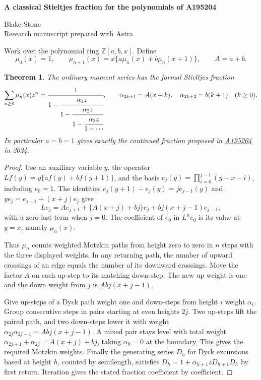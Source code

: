 \documentclass[11pt,letterpaper]{article}
\newtheorem{theorem}{Theorem}
\newcommand{\oeis}[1]{\href{https://oeis.org/A#1}{A#1}}
\begin{document}
\thispagestyle{plain}
\begin{center}
{\LARGE\bfseries A classical Stieltjes fraction for the polynomials of A195204\par}
\vspace{0.5em}
Blake Stone\\
{\small Research manuscript prepared with Astra}
\end{center}

\begin{abstract}
A falling-factorial basis turns the defining shift of OEIS A195204 into a tridiagonal operator. Pairing the steps of a Dyck path proves Peter Bala's continued-fraction conjecture directly. The resulting fraction belongs to the classical cycle--excedance Eulerian family. The same calculation gives diagonal forms over the integer polynomial ring for both the Hankel matrix and its first shift.
\end{abstract}

Work over the polynomial ring \(\mathbb Z[a,b,x]\). Define
\[
 \mu_0(x)=1,\qquad \mu_{n+1}(x)=x\{a\mu_n(x)+b\mu_n(x+1)\},\qquad A=a+b.
\]
\begin{theorem}
The ordinary moment series has the formal Stieltjes fraction
\[
  \sum_{n\ge0}\mu_n(x)z^n
  =\cfrac{1}{1-\cfrac{\alpha_1z}{1-\cfrac{\alpha_2z}
       {1-\cfrac{\alpha_3z}{1-\cdots}}}},\qquad
  \alpha_{2k+1}=A(x+k),\quad \alpha_{2k+2}=b(k+1)\quad(k\ge0).
\]
In particular \(a=b=1\) gives exactly the continued fraction proposed in \oeis{195204} in 2024.
\end{theorem}
\begin{proof}
Use an auxiliary variable \(y\), the operator \(L f(y)=y\{af(y)+bf(y+1)\}\), and the basis \(e_j(y)=\prod_{i=0}^{j-1}(y-x-i)\), including \(e_0=1\). The identities \(e_j(y+1)-e_j(y)=je_{j-1}(y)\) and \(ye_j=e_{j+1}+(x+j)e_j\) give
\[
 L e_j=A e_{j+1}+\{A(x+j)+bj\}e_j+bj(x+j-1)e_{j-1},
\]
with a zero last term when \(j=0\). The coefficient of \(e_0\) in \(L^n e_0\) is its value at \(y=x\), namely \(\mu_n(x)\).

Thus \(\mu_n\) counts weighted Motzkin paths from height zero to zero in \(n\) steps with the three displayed weights. In any returning path, the number of upward crossings of an edge equals the number of its downward crossings. Move the factor \(A\) on each up-step to its matching down-step. The new up weight is one and the down weight from \(j\) is \(Abj(x+j-1)\).

Give up-steps of a Dyck path weight one and down-steps from height \(i\) weight \(\alpha_i\). Group consecutive steps in pairs starting at even heights \(2j\). Two up-steps lift the paired path, and two down-steps lower it with weight \(\alpha_{2j}\alpha_{2j-1}=Abj(x+j-1)\). A mixed pair stays level with total weight \(\alpha_{2j+1}+\alpha_{2j}=A(x+j)+bj\), taking \(\alpha_0=0\) at the boundary. This gives the required Motzkin weights. Finally the generating series \(D_h\) for Dyck excursions based at height \(h\), counted by semilength, satisfies \(D_h=1+\alpha_{h+1}zD_{h+1}D_h\) by first return. Iteration gives the stated fraction coefficient by coefficient.
\end{proof}
\end{document}
